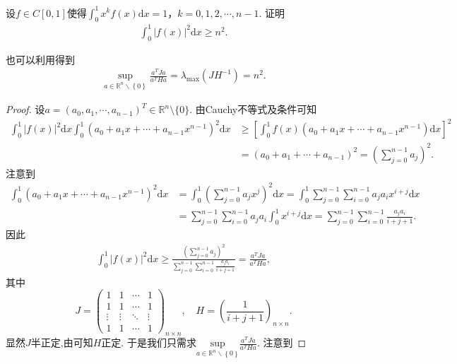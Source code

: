 \documentclass[../../main.tex]{subfiles}
\begin{document}
\begin{proposition}\label{proposition:Hilbert矩阵性质的应用1}
设$f\in C[0,1]$使得$\int_{0}^{1}x^{k}f(x)\mathrm{d}x = 1$，$k = 0,1,2,\cdots,n - 1$. 证明
\begin{align*}
\int_{0}^{1}|f(x)|^{2}\mathrm{d}x\geqslant n^{2}.
\end{align*}
\end{proposition}
\begin{note}
也可以利用得到\begin{align*}
\mathop {\mathrm{sup}} \limits_{a\in \mathbb{R} ^n\backslash \left\{ 0 \right\}}\frac{a^TJa}{a^THa}=\lambda _{\max}\left( JH^{-1} \right) =n^2.
\end{align*}
\end{note}
\begin{proof}
设$a=(a_0,a_1,\cdots,a_{n-1})^T\in\mathbb{R}^n\setminus\{0\}$. 由Cauchy不等式及条件可知
\begin{align*}
\int_0^1 |f(x)|^2\mathrm{d}x \int_0^1 (a_0 + a_1x + \cdots + a_{n-1}x^{n-1})^2\mathrm{d}x &\geqslant \left[ \int_0^1 f(x)(a_0 + a_1x + \cdots + a_{n-1}x^{n-1})\mathrm{d}x \right]^2 \\
&= (a_0 + a_1 + \cdots + a_{n-1})^2 = \left( \sum_{j=0}^{n-1}a_j \right)^2.
\end{align*}
注意到
\begin{align*}
\int_0^1 (a_0 + a_1x + \cdots + a_{n-1}x^{n-1})^2\mathrm{d}x &= \int_0^1 \left( \sum_{j=0}^{n-1}a_jx^j \right)^2\mathrm{d}x = \int_0^1 \sum_{j=0}^{n-1}\sum_{i=0}^{n-1}a_ja_ix^{i+j}\mathrm{d}x \\
&= \sum_{j=0}^{n-1}\sum_{i=0}^{n-1}a_ja_i \int_0^1 x^{i+j}\mathrm{d}x = \sum_{j=0}^{n-1}\sum_{i=0}^{n-1}\frac{a_ja_i}{i+j+1}.
\end{align*}
因此
\begin{align*}
\int_0^1 |f(x)|^2\mathrm{d}x \geqslant \frac{\left( \sum\limits_{j=0}^{n-1}a_j \right)^2}{\sum\limits_{j=0}^{n-1}\sum\limits_{i=0}^{n-1}\frac{a_ja_i}{i+j+1}} = \frac{a^TJa}{a^THa},
\end{align*}
其中
$$
J=\begin{pmatrix}1 & 1 & \cdots & 1 \\ 1 & 1 & \cdots & 1 \\ \vdots & \vdots & \ddots & \vdots \\ 1 & 1 & \cdots & 1\end{pmatrix}_{n\times n},\quad H=\left( \frac{1}{i+j+1} \right)_{n\times n}.
$$
显然$J$半正定,由可知$H$正定. 于是我们只需求$\underset{a\in \mathbb{R} ^n\backslash \left\{ 0 \right\}}{\mathrm{sup}}\frac{a^TJa}{a^THa}$. 注意到

\end{proof}
\end{document}
